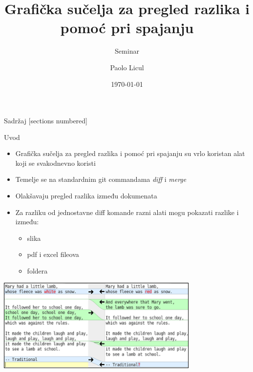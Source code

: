 \documentclass[10pt]{beamer}
\title{Grafička sučelja za pregled razlika i pomoć pri spajanju}
\subtitle{Seminar}
\date{\today}
\author{Paolo Licul}{Nino Dumičić}
\begin{document}
\maketitle

\begin{frame}{Sadržaj}
  [sections numbered]
  \tableofcontents[hideallsubsections]
\end{frame}


\begin{frame}{Uvod}
	\begin{itemize}
		\item Grafička sučelja za pregled razlika i pomoć pri spajanju su vrlo koristan alat koji se svakodnevno koristi
		\item Temelje se na standardnim git commandama \emph{diff} i \emph{merge}
		\item Olakšavaju pregled razlika između dokumenata
		\item Za razliku od jednostavne diff komande razni alati mogu pokazati razlike i između: \begin{itemize}
		\item slika
		\item pdf i excel fileova
		\item foldera
		\end{itemize}
	\end{itemize} 
	
\includegraphics[width=10cm]{gui.png}
\end{frame}


\end{document}
